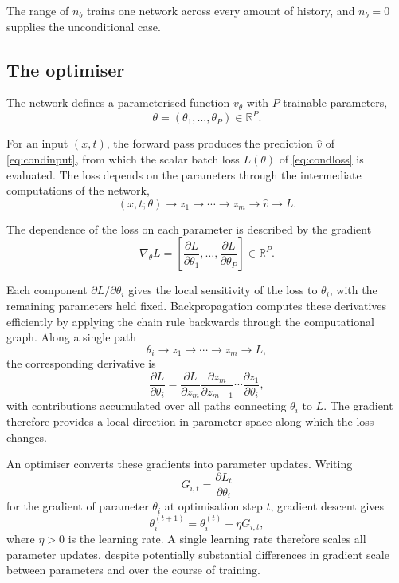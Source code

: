 \documentclass[10pt,a4paper]{article}
\begin{document}
The range of $n_b$ trains one network across every amount of history, and
$n_b=0$ supplies the unconditional case.

\subsection{The optimiser}

The network defines a parameterised function $v_\theta$ with $P$ trainable
parameters,
\[
\theta=(\theta_1,\ldots,\theta_P)\in\mathbb{R}^P.
\]

For an input $(x,t)$, the forward pass produces the prediction $\hat v$ of
\eqref{eq:condinput}, from which the scalar batch loss $L(\theta)$ of
\eqref{eq:condloss} is evaluated. The loss depends on the parameters through the
intermediate computations of the network,
\begin{equation}
(x,t;\theta)
\longrightarrow z_1
\longrightarrow \cdots
\longrightarrow z_m
\longrightarrow \hat v
\longrightarrow L.
\end{equation}

The dependence of the loss on each parameter is described by the gradient
\begin{equation}
\nabla_\theta L
=
\left[
\frac{\partial L}{\partial\theta_1},
\ldots,
\frac{\partial L}{\partial\theta_P}
\right]
\in\mathbb{R}^P.
\end{equation}

Each component $\partial L/\partial\theta_i$ gives the local sensitivity of the
loss to $\theta_i$, with the remaining parameters held fixed. Backpropagation
computes these derivatives efficiently by applying the chain rule backwards
through the computational graph. Along a single path
\[
\theta_i\rightarrow z_1\rightarrow\cdots\rightarrow z_m\rightarrow L,
\]
the corresponding derivative is
\begin{equation}
\frac{\partial L}{\partial\theta_i}
=
\frac{\partial L}{\partial z_m}
\frac{\partial z_m}{\partial z_{m-1}}
\cdots
\frac{\partial z_1}{\partial\theta_i},
\end{equation}
with contributions accumulated over all paths connecting $\theta_i$ to $L$. The
gradient therefore provides a local direction in parameter space along which the
loss changes.

An optimiser converts these gradients into parameter updates. Writing
\begin{equation}
G_{i,t}
=
\frac{\partial L_t}{\partial\theta_i}
\end{equation}
for the gradient of parameter $\theta_i$ at optimisation step $t$, gradient
descent gives
\begin{equation}
\theta_i^{(t+1)}
=
\theta_i^{(t)}
-
\eta G_{i,t},
\end{equation}
where $\eta>0$ is the learning rate. A single learning rate therefore scales all
parameter updates, despite potentially substantial differences in gradient scale
between parameters and over the course of training.
\end{document}
